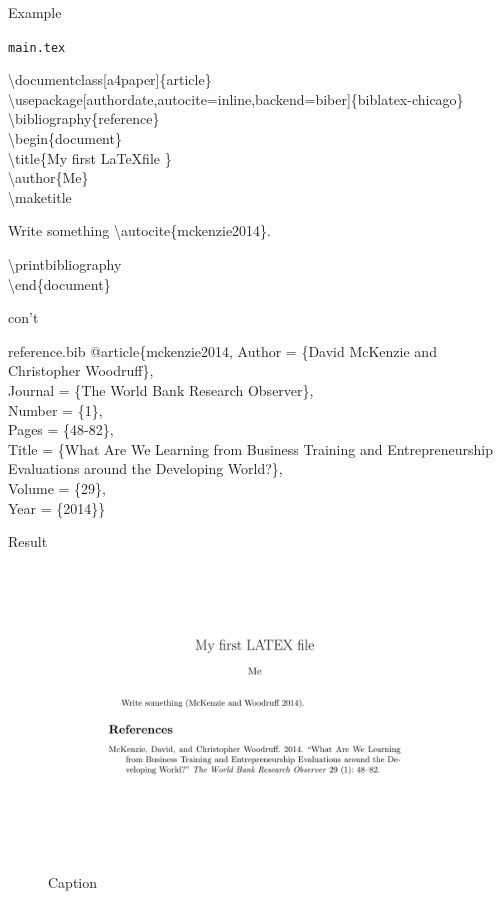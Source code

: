 \documentclass[xcolor=dvipsnames]{beamer} %
\begin{document}
\begin{frame}{Example}
\begin{block}{\texttt{main.tex}}

\textbackslash documentclass[a4paper]\{article\}
\textbackslash usepackage[authordate,autocite=inline,backend=biber]\{biblatex-chicago\}
\textbackslash bibliography\{reference\}\\
\vspace{}
\textbackslash begin\{document\} \\
\textbackslash title\{My first \LaTeX file \} \\
\textbackslash author\{Me\} \\
\textbackslash maketitle

\vspace{}
Write something \textbackslash autocite\{mckenzie2014\}.

\textbackslash printbibliography  \\
\textbackslash end\{document\}
\end{block}
\end{frame}
\begin{frame}{con't}
    

\begin{block}{reference.bib}
@article\{mckenzie2014,
	Author = \{David McKenzie and Christopher Woodruff\},\\
	Journal = \{The World Bank Research Observer\},\\
	Number = \{1\},\\
	Pages = \{48-82\},\\
	Title = \{What Are We Learning from Business Training and Entrepreneurship Evaluations around the Developing World?\},\\
	Volume = \{29\},\\
	Year = \{2014\}\}

\end{block}
\end{frame}
    
\begin{frame}{Result}
\begin{figure}
    \centering
    \includegraphics[width = 13cm, height = 8cm]{figures/figure 1.png}
    \caption{Caption}
\end{figure}

\end{frame}
\end{document}
